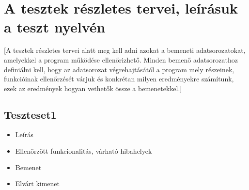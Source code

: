 \section{A tesztek részletes tervei, leírásuk a teszt nyelvén}
[A tesztek részletes tervei alatt meg kell adni azokat a bemeneti adatsorozatokat, amelyekkel a program működése ellenőrizhető. Minden bemenő adatsorozathoz definiálni kell, hogy az adatsorozat végrehajtásától a program mely részeinek, funkcióinak ellenőrzését várjuk és konkrétan milyen eredményekre számítunk, ezek az eredmények hogyan vethetők össze a bemenetekkel.]

\subsection{Teszteset1}
\begin{itemize}
\item Leírás\newline
{}
\item Ellenőrzött funkcionalitás, várható hibahelyek
\item Bemenet\newline
{}
\item Elvárt kimenet\newline
{}
\end{itemize}

